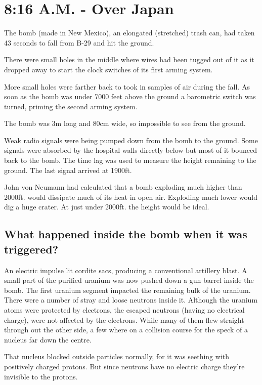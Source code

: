 %

\section{8:16 A.M. - Over Japan}

The bomb (made in New Mexico), an elongated (stretched) trash can, had taken 43 seconds to fall from B-29 and hit the ground.

There were small holes in the middle where wires had been tugged out of it as it dropped away to start the clock switches of its first arming system.

More small holes were farther back to took in samples of air during the fall. As soon as the bomb was under 7000 feet above the ground a barometric switch was turned, priming the second arming system.

The bomb was 3m long and 80cm wide, so impossible to see from the ground.

Weak radio signals were being pumped down from the bomb to the ground. Some signals were absorbed by the hospital walls directly below but most of it bounced back to the bomb. The time lag was used to measure the height remaining to the ground. The last signal arrived at 1900ft. 

John von Neumann had calculated that a bomb exploding much higher than 2000ft. would dissipate much of its heat in open air. Exploding much lower would dig a huge crater. At just under 2000ft. the height would be ideal.

\subsection*{What happened inside the bomb when it was triggered?}

An electric impulse lit cordite sacs, producing a conventional artillery blast. A small part of the purified uranium was now pushed down a gun barrel inside the bomb.
The first uranium segment impacted the remaining bulk of the uranium. There were a number of stray and loose neutrons inside it. Although the uranium atoms were protected by electrons, the escaped neutrons (having no electrical charge), were not affected by the electrons. While many of them flew straight through out the other side, a few where on a collision course for the speck of a nucleus far down the centre. 

That nucleus blocked outside particles normally, for it was seething with positively charged protons. But since neutrons have no electric charge they're invisible to the protons. 


